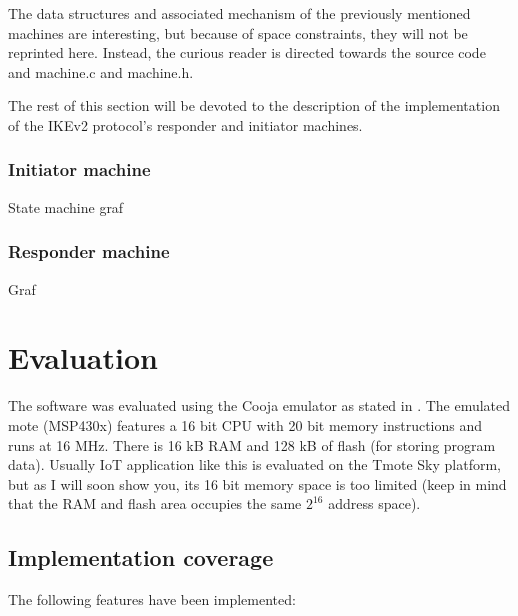 \documentclass[final,a4paper,twoside,11pt,onecolumn]{report}
\begin{document}
The data structures and associated mechanism of the previously mentioned machines are interesting, but because of space constraints, they will not be reprinted here. Instead, the curious reader is directed towards the source code and machine.c and machine.h.

The rest of this section will be devoted to the description of the implementation of the IKEv2 protocol's responder and initiator machines.

\subsection{Initiator machine}
State machine graf

\subsection{Responder machine}
Graf


\chapter{Evaluation}
\label{cha:eval}
The software was evaluated using the Cooja emulator as stated in . The emulated mote (MSP430x) features a 16 bit CPU with 20 bit memory instructions and runs at 16 MHz. There is 16 kB RAM and 128 kB of flash (for storing program data). Usually IoT application like this is evaluated on the Tmote Sky platform, but as I will soon show you, its 16 bit memory space is too limited (keep in mind that the RAM and flash area occupies the same $2^16$ address space).

\section{Implementation coverage}
The following features have been implemented:
\end{document}
